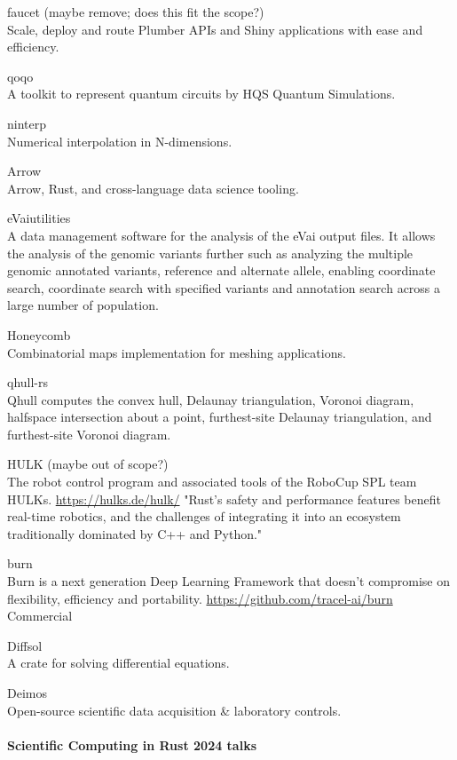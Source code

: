 \documentclass{article}
\begin{document}
faucet (maybe remove; does this fit the scope?)\\
Scale, deploy and route Plumber APIs and Shiny
applications with ease and efficiency.

qoqo\\
A toolkit to represent quantum circuits by HQS Quantum Simulations.

ninterp\\
Numerical interpolation in N-dimensions.

Arrow\\
Arrow, Rust, and cross-language data science tooling.

eVaiutilities\\
A data management software for the analysis of the eVai output files. It allows the
analysis of the genomic variants further such as analyzing the multiple genomic annotated variants,
reference and alternate allele, enabling coordinate search, coordinate search with specified
variants and annotation search across a large number of population.

Honeycomb\\
Combinatorial maps implementation for meshing applications.

qhull-rs\\
Qhull computes the convex hull, Delaunay triangulation, Voronoi diagram, halfspace
intersection about a point, furthest-site Delaunay triangulation, and furthest-site Voronoi
diagram.

HULK (maybe out of scope?)\\
The robot control program and associated tools of the RoboCup SPL team
HULKs. \url{https://hulks.de/hulk/} "Rust’s safety and performance features benefit real-time
robotics, and the challenges of integrating it into an ecosystem traditionally dominated by C++ and
Python."

burn\\
Burn is a next generation Deep Learning Framework that doesn't compromise on flexibility,
efficiency and portability. \url{https://github.com/tracel-ai/burn}\\
Commercial

Diffsol\\
A crate for solving differential equations.

Deimos\\
Open-source scientific data acquisition \& laboratory controls.

\paragraph{Scientific Computing in Rust 2024 talks}
\end{document}
